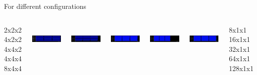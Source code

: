\documentclass[aspectratio=169]{bredelebeamer}
\begin{document}
\begin{frame}{For different configurations}
\begin{columns}[c]


2x2x2\\
\vspace{1.25cm}
4x2x2\\
\vspace{1cm}
4x4x2\\
\vspace{1cm}
4x4x4\\
\vspace{1cm}
8x4x4





\includegraphics[height=1.5cm, width=4.5cm]{"./img/general/2x2x2"}


\includegraphics[height=1.5cm, width=4.5cm]{"./img/general/4x2x2"}


\includegraphics[height=1.5cm, width=4.5cm]{"./img/general/4x4x2"}


\includegraphics[height=1.5cm, width=4.5cm]{"./img/general/4x4x4"}


\includegraphics[height=1.5cm, width=4.5cm]{"./img/general/8x4x4"}




8x1x1 \\
\vspace{1.25cm}
16x1x1\\
\vspace{1cm}
32x1x1\\
\vspace{1cm}
64x1x1\\
\vspace{1cm}
128x1x1\\



\end{columns}
\end{frame}
\end{document}
